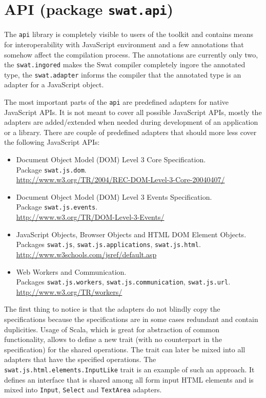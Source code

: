 \documentclass[12pt,a4paper]{report}
\begin{document}
\section{API (package \texttt{swat.api})}

The \texttt{api} library is completely visible to users of the toolkit and contains means for interoperability with JavaScript environment and a few annotations that somehow affect the compilation process. The annotations are currently only two, the \texttt{swat.ingored} makes the Swat compiler completely ingore the annotated type, the \texttt{swat.adapter} informs the compiler that the annotated type is an adapter for a JavaScript object.

The most important parts of the \texttt{api} are predefined adapters for native JavaScript APIs. It is not meant to cover all possible JavaScript APIs, mostly the adapters are added/extended when needed during development of an application or a library. There are couple of predefined adapters that should more less cover the following JavaScript APIs:

\begin{itemize}
\item Document Object Model (DOM) Level 3 Core Specification.\\
Package \texttt{swat.js.dom}.\\
\url{http://www.w3.org/TR/2004/REC-DOM-Level-3-Core-20040407/}
\item Document Object Model (DOM) Level 3 Events Specification.\\
Package \texttt{swat.js.events}.\\
\url{http://www.w3.org/TR/DOM-Level-3-Events/}
\item JavaScript Objects, Browser Objects and HTML DOM Element Objects.\\
Packages \texttt{swat.js}, \texttt{swat.js.applications}, \texttt{swat.js.html}.\\
\url{http://www.w3schools.com/jsref/default.asp}
\item Web Workers and Communication.\\
Packages \texttt{swat.js.workers}, \texttt{swat.js.communication}, \texttt{swat.js.url}.\\
\url{http://www.w3.org/TR/workers/}
\end{itemize}

The first thing to notice is that the adapters do not blindly copy the specifications because the specifications are in some cases redundant and contain duplicities. Usage of Scala, which is great for abstraction of common functionality, allows to define a new trait (with no counterpart in the specification) for the shared operations. The trait can later be mixed into all adapters that have the specified operations. The \texttt{swat.js.html.elements.InputLike} trait is an example of such an approach. It defines an interface that is shared among all form input HTML elements and is mixed into \texttt{Input}, \texttt{Select} and \texttt{TextArea} adapters.
\end{document}
